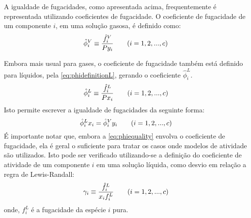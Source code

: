 
A igualdade de fugacidades, como apresentada acima, frequentemente é
representada utilizando coeficientes de fugacidade.
O coeficiente de fugacidade de um componente $i$, em uma solução gasosa, é
definido como:
\begin{equation}
\hat{\phi}^V_i \equiv \dfrac{\hat{f}^V_i}{Py_i} \qquad (i = 1,2,...,c) \\
\label{eq:phidefinition}
\end{equation}


Embora mais usual para gases, o coeficiente de fugacidade também
está definido para líquidos, pela \autoref{eq:phidefinitionL}, gerando o coeficiente $\hat{\phi}^L_i$.
\begin{equation}
\hat{\phi}^L_i \equiv \dfrac{\hat{f}^L_i}{Px_i} \qquad (i = 1,2,...,c) \\
\label{eq:phidefinitionL}
\end{equation}
Isto permite escrever a igualdade de fugacidades da seguinte forma:
\begin{equation}
\hat{\phi}^L_i x_i = \hat{\phi}^V_i y_i \qquad (i = 1,2,...,c) \\
\label{eq:phiequality}
\end{equation}
É importante notar que, embora a \autoref{eq:phiequality} envolva o
coeficiente de fugacidade, ela é geral o suficiente para tratar os casos onde
modelos de atividade são utilizados.
Isto pode ser verificado utilizando-se a definição do coeficiente de atividade
de um componente $i$ em uma solução líquida, como desvio em relação a regra de Lewis-Randall:
\begin{equation}
\gamma_i \equiv \dfrac{\hat{f}^L_i}{x_if^L_i} \qquad (i = 1,2,...,c) \\
\label{eq:gammadefinition}
\end{equation}
onde, $f^L_i$ é a fugacidade da espécie $i$ pura.

